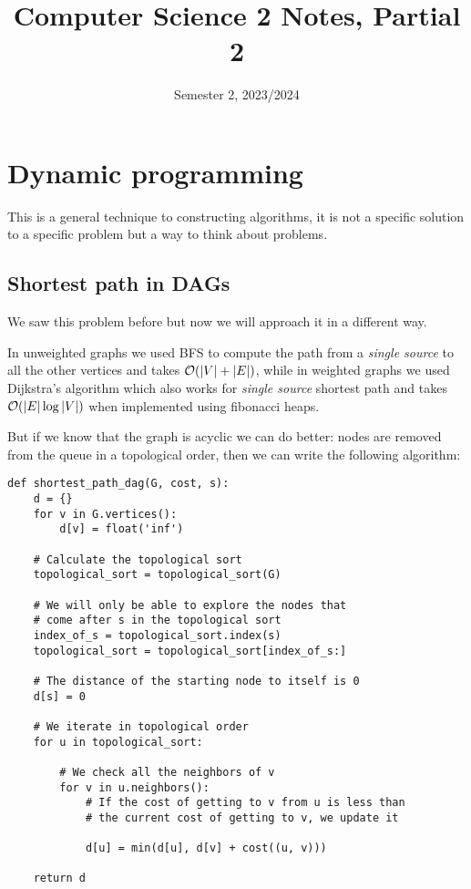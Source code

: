\documentclass[12pt]{extarticle}
\title{Computer Science 2 Notes, Partial 2}
\date{Semester 2, 2023/2024}
\begin{document}
\firstpage

\section{Dynamic programming}

This is a general technique to constructing algorithms, it is not a specific solution to a specific problem but a way to think about problems.

\subsection{Shortest path in DAGs}

We saw this problem before but now we will approach it in a different way.

In unweighted graphs we used BFS to compute the path from a \textit{single source} to all the other vertices and takes $\mathcal{O}(|V| + |E|)$, while in weighted graphs we used Dijkstra's algorithm which also works for \textit{single source} shortest path and takes $\mathcal{O}(|E| \log |V|)$ when implemented using fibonacci heaps.

But if we know that the graph is acyclic we can do better: nodes are removed from the queue in a topological order, then we can write the following algorithm:

\begin{verbatim}
def shortest_path_dag(G, cost, s):
    d = {}
    for v in G.vertices():
        d[v] = float('inf')

    # Calculate the topological sort
    topological_sort = topological_sort(G)

    # We will only be able to explore the nodes that
    # come after s in the topological sort
    index_of_s = topological_sort.index(s)
    topological_sort = topological_sort[index_of_s:]

    # The distance of the starting node to itself is 0
    d[s] = 0

    # We iterate in topological order
    for u in topological_sort:

        # We check all the neighbors of v
        for v in u.neighbors():
            # If the cost of getting to v from u is less than
            # the current cost of getting to v, we update it
            
            d[u] = min(d[u], d[v] + cost((u, v)))

    return d
\end{verbatim}
\end{document}
